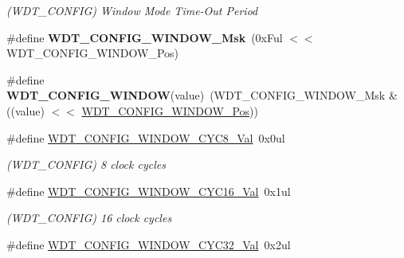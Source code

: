 \begin{DoxyCompactItemize}
\begin{DoxyCompactList}\small\item\em (W\+D\+T\+\_\+\+C\+O\+N\+F\+I\+G) Window Mode Time-\/\+Out Period \end{DoxyCompactList}\item 
\hypertarget{group___s_a_m_l21___w_d_t_gadbf0e2faa64af4cac57e1279414aa8ad}{}\#define {\bfseries W\+D\+T\+\_\+\+C\+O\+N\+F\+I\+G\+\_\+\+W\+I\+N\+D\+O\+W\+\_\+\+Msk}~(0x\+Ful $<$$<$ W\+D\+T\+\_\+\+C\+O\+N\+F\+I\+G\+\_\+\+W\+I\+N\+D\+O\+W\+\_\+\+Pos)\label{group___s_a_m_l21___w_d_t_gadbf0e2faa64af4cac57e1279414aa8ad}

\item 
\hypertarget{group___s_a_m_l21___w_d_t_gacfafc7c7ce1a04a46d9b972c667a4706}{}\#define {\bfseries W\+D\+T\+\_\+\+C\+O\+N\+F\+I\+G\+\_\+\+W\+I\+N\+D\+O\+W}(value)~(W\+D\+T\+\_\+\+C\+O\+N\+F\+I\+G\+\_\+\+W\+I\+N\+D\+O\+W\+\_\+\+Msk \& ((value) $<$$<$ \hyperlink{group___s_a_m_l21___w_d_t_gab2d3263bd9ad06e3257234d9da623ef8}{W\+D\+T\+\_\+\+C\+O\+N\+F\+I\+G\+\_\+\+W\+I\+N\+D\+O\+W\+\_\+\+Pos}))\label{group___s_a_m_l21___w_d_t_gacfafc7c7ce1a04a46d9b972c667a4706}

\item 
\hypertarget{group___s_a_m_l21___w_d_t_ga6c3961932249ae130fcfba2c4a7eb4d5}{}\#define \hyperlink{group___s_a_m_l21___w_d_t_ga6c3961932249ae130fcfba2c4a7eb4d5}{W\+D\+T\+\_\+\+C\+O\+N\+F\+I\+G\+\_\+\+W\+I\+N\+D\+O\+W\+\_\+\+C\+Y\+C8\+\_\+\+Val}~0x0ul\label{group___s_a_m_l21___w_d_t_ga6c3961932249ae130fcfba2c4a7eb4d5}

\begin{DoxyCompactList}\small\item\em (W\+D\+T\+\_\+\+C\+O\+N\+F\+I\+G) 8 clock cycles \end{DoxyCompactList}\item 
\hypertarget{group___s_a_m_l21___w_d_t_ga1c19b5a551e3cf9e57c3291657fcaa85}{}\#define \hyperlink{group___s_a_m_l21___w_d_t_ga1c19b5a551e3cf9e57c3291657fcaa85}{W\+D\+T\+\_\+\+C\+O\+N\+F\+I\+G\+\_\+\+W\+I\+N\+D\+O\+W\+\_\+\+C\+Y\+C16\+\_\+\+Val}~0x1ul\label{group___s_a_m_l21___w_d_t_ga1c19b5a551e3cf9e57c3291657fcaa85}

\begin{DoxyCompactList}\small\item\em (W\+D\+T\+\_\+\+C\+O\+N\+F\+I\+G) 16 clock cycles \end{DoxyCompactList}\item 
\hypertarget{group___s_a_m_l21___w_d_t_ga42465a866ecbf65f33e452beb05cb8d0}{}\#define \hyperlink{group___s_a_m_l21___w_d_t_ga42465a866ecbf65f33e452beb05cb8d0}{W\+D\+T\+\_\+\+C\+O\+N\+F\+I\+G\+\_\+\+W\+I\+N\+D\+O\+W\+\_\+\+C\+Y\+C32\+\_\+\+Val}~0x2ul\label{group___s_a_m_l21___w_d_t_ga42465a866ecbf65f33e452beb05cb8d0}


\end{DoxyCompactItemize}
